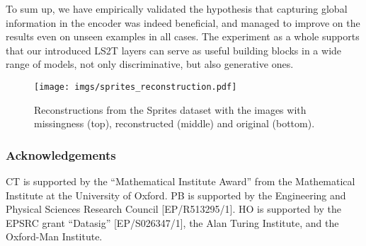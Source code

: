 \documentclass{article} \usepackage{iclr2021_conference,times}
\theoremstyle{plain}
\theoremstyle{definition}
\begin{document}
To sum up, we have empirically validated the hypothesis that capturing global information in the encoder was indeed beneficial, and managed to improve on the results even on unseen examples in all cases. The experiment as a whole supports that our introduced LS2T layers can serve as useful building blocks in a wide range of models, not only discriminative, but also generative ones.

\begin{figure}[t]
	\centering
\texttt{[image: imgs/sprites\_reconstruction.pdf]}
\caption{Reconstructions from the Sprites dataset with the images with missingness (top), reconstructed (middle) and original (bottom).}
\end{figure}

\newpage

\subsubsection*{Acknowledgements}
CT is supported by the ``Mathematical Institute Award'' from the Mathematical Institute at the University of Oxford. PB is supported by the Engineering and Physical Sciences Research Council [EP/R513295/1].
HO is supported by the EPSRC grant ``Datasig'' [EP/S026347/1], the Alan Turing Institute, and the Oxford-Man Institute.
	




















































		
\end{document}
